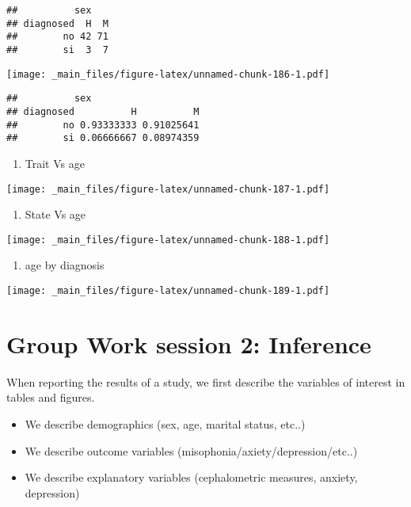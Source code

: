 \documentclass[
]{book}
\providecommand{\tightlist}{%
  \setlength{\itemsep}{0pt}\setlength{\parskip}{0pt}}
\begin{document}
\begin{verbatim}
##          sex
## diagnosed  H  M
##        no 42 71
##        si  3  7
\end{verbatim}

\texttt{[image: \_main\_files/figure-latex/unnamed-chunk-186-1.pdf]}

\begin{verbatim}
##          sex
## diagnosed          H          M
##        no 0.93333333 0.91025641
##        si 0.06666667 0.08974359
\end{verbatim}

\begin{enumerate}
\def\labelenumi{\alph{enumi}.}
\setcounter{enumi}{7}
\tightlist
\item
  Trait Vs age
\end{enumerate}

\texttt{[image: \_main\_files/figure-latex/unnamed-chunk-187-1.pdf]}

\begin{enumerate}
\def\labelenumi{\roman{enumi}.}
\tightlist
\item
  State Vs age
\end{enumerate}

\texttt{[image: \_main\_files/figure-latex/unnamed-chunk-188-1.pdf]}

\begin{enumerate}
\def\labelenumi{\alph{enumi}.}
\setcounter{enumi}{9}
\tightlist
\item
  age by diagnosis
\end{enumerate}

\texttt{[image: \_main\_files/figure-latex/unnamed-chunk-189-1.pdf]}

\hypertarget{group-work-session-2-inference}{%
\section{Group Work session 2: Inference}\label{group-work-session-2-inference}}

When reporting the results of a study, we first describe the variables of interest in tables and figures.

\begin{itemize}
\tightlist
\item
  We describe demographics (sex, age, marital status, etc..)
\item
  We describe outcome variables (misophonia/axiety/depression/etc..)
\item
  We describe explanatory variables (cephalometric measures, anxiety, depression)
\end{itemize}
\end{document}

